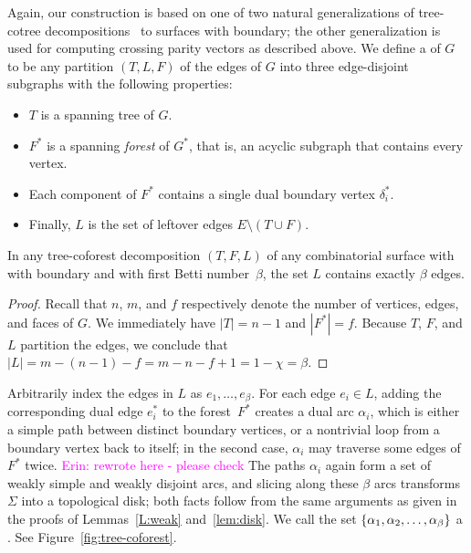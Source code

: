 \documentclass[letterpaper,review]{siamart190516}
\def\dualarc{\alpha}
\def\enote#1{\textcolor{magenta}{Erin: #1}}
\begin{document}
Again, our construction is based on one of two natural generalizations of tree-cotree
decompositions~\cite{e-dgteg-03} to surfaces with boundary; the other generalization is used for
computing crossing parity vectors as described above.
We define a  of $G$ to be any partition $(T, L, F)$ of the edges of $G$ into three edge-disjoint subgraphs with the following properties:
\begin{itemize}\itemsep0pt
\item $T$ is a spanning tree of $G$.
\item $F^*$ is a spanning \emph{forest} of $G^*$, that is, an acyclic subgraph that contains every vertex.
\item Each component of $F^*$ contains a single dual boundary vertex $\delta_i^*$.
\item Finally, $L$ is the set of leftover edges $E \setminus (T\cup F)$.
\end{itemize}
%
\begin{lemma}
\label{lem:L_edges_tree_coforest}
In any tree-coforest decomposition $(T, F, L)$ of any combinatorial surface with with boundary and with first Betti number~$\beta$, the set $L$ contains exactly $\beta$ edges.
\end{lemma}

\begin{proof}
Recall that $n$, $m$, and $f$ respectively denote the number of vertices, edges, and faces of $G$.
We immediately have $|T| = n-1$ and $|F^*| = f$.  Because $T$, $F$, and $L$ partition the edges, we conclude that $|L| = m - (n-1) - f = m - n - f + 1 = 1 - \chi  = \beta$.
\end{proof}

Arbitrarily index the edges in $L$ as $e_1, \dots, e_\beta$.  For each edge $e_i\in L$, adding the corresponding dual edge $e_i^*$ to the forest~$F^*$ creates a dual arc $\dualarc_i$, which is either a simple path between distinct boundary vertices, or a nontrivial loop from a boundary vertex back to itself; in the second case, $\dualarc_i$ may traverse some edges of $F^*$ twice.  \enote{rewrote here - please  check}
The paths $\dualarc_i$ again form a set of weakly simple and weakly disjoint arcs, and slicing along these $\beta$ arcs transforms $\Sigma$ into a topological disk; both facts follow from the same arguments as given in the proofs of Lemmas~\ref{L:weak} and~\ref{lem:disk}.
We call the set $\set{\dualarc_1, \dualarc_2, \dots, \dualarc_\beta}$ a .  See Figure~\ref{fig:tree-coforest}.  
\end{document}
